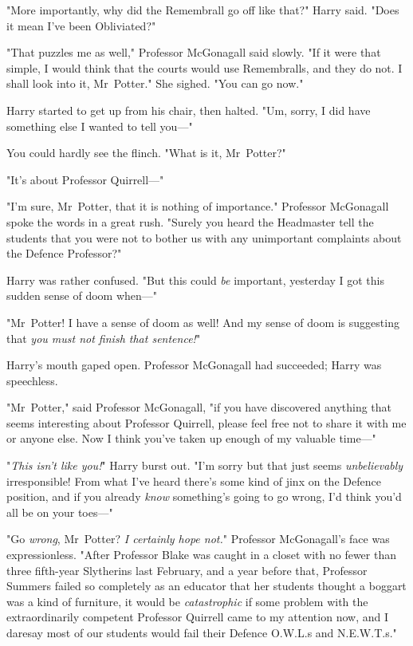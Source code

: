 "More importantly, why did the Remembrall go off like that?" Harry said. "Does
it mean I’ve been Obliviated?"

"That puzzles me as well," Professor McGonagall said slowly. "If it were that
simple, I would think that the courts would use Remembralls, and they do not. I
shall look into it, Mr~Potter." She sighed. "You can go now."

Harry started to get up from his chair, then halted. "Um, sorry, I did have
something else I wanted to tell you—"

You could hardly see the flinch. "What is it, Mr~Potter?"

"It’s about Professor Quirrell—"

"I’m sure, Mr~Potter, that it is nothing of importance." Professor McGonagall
spoke the words in a great rush. "Surely you heard the Headmaster tell the
students that you were not to bother us with any unimportant complaints about
the Defence Professor?"

Harry was rather confused. "But this could \emph{be} important, yesterday I got
this sudden sense of doom when—"

"Mr~Potter! I have a sense of doom as well! And my sense of doom is suggesting
that \emph{you must not finish that sentence!}"

Harry’s mouth gaped open. Professor McGonagall had succeeded; Harry was
speechless.

"Mr~Potter," said Professor McGonagall, "if you have discovered anything that
seems interesting about Professor Quirrell, please feel free not to share it
with me or anyone else. Now I think you’ve taken up enough of my valuable
time—"

"\emph{This isn’t like you!}" Harry burst out. "I’m sorry but that just seems
\emph{unbelievably} irresponsible! From what I’ve heard there’s some kind of
jinx on the Defence position, and if you already \emph{know} something’s going
to go wrong, I’d think you’d all be on your toes—"

"Go \emph{wrong}, Mr~Potter? \emph{I certainly hope not.}" Professor
McGonagall’s face was expressionless. "After Professor Blake was caught in a
closet with no fewer than three fifth-year Slytherins last February, and a year
before that, Professor Summers failed so completely as an educator that her
students thought a boggart was a kind of furniture, it would be
\emph{catastrophic} if some problem with the extraordinarily competent
Professor Quirrell came to my attention now, and I daresay most of our students
would fail their Defence O.W.L.s and N.E.W.T.s."

